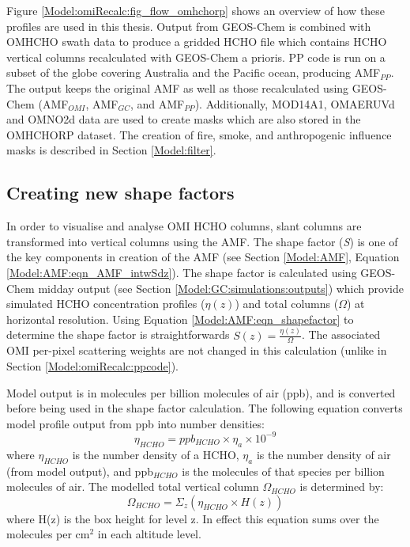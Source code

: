     
    Figure \ref{Model:omiRecalc:fig_flow_omhchorp} shows an overview of how these profiles are used in this thesis.
    Output from GEOS-Chem is combined with OMHCHO swath data to produce a gridded HCHO file which contains HCHO vertical columns recalculated with GEOS-Chem a prioris.
    PP code is run on a subset of the globe covering Australia and the Pacific ocean, producing AMF$_{PP}$.
    The output keeps the original AMF as well as those recalculated using GEOS-Chem (AMF$_{OMI}$, AMF$_{GC}$, and AMF$_{PP}$).
    Additionally, MOD14A1, OMAERUVd and OMNO2d data are used to create masks which are also stored in the OMHCHORP dataset.
    The creation of fire, smoke, and anthropogenic influence masks is described in Section \ref{Model:filter}.
    
      
    
  \subsection{Creating new shape factors}
    In order to visualise and analyse OMI HCHO columns, slant columns are transformed into vertical columns using the AMF.
    The shape factor (\textit{S}) is one of the key components in creation of the AMF (see Section \ref{Model:AMF}, Equation \ref{Model:AMF:eqn_AMF_intwSdz}).
    The shape factor is calculated using GEOS-Chem midday output (see Section \ref{Model:GC:simulations:outputs}) which provide simulated HCHO concentration profiles ($\eta(z)$) and total columns ($\Omega$) at \lowhr horizontal resolution.
    Using Equation \ref{Model:AMF:eqn_shapefactor} to determine the shape factor is straightforwards $S(z) = \frac{\eta(z)}{\Omega}$.
    The associated OMI per-pixel scattering weights are not changed in this calculation (unlike in Section \ref{Model:omiRecalc:ppcode}).
    
    Model output is in molecules per billion molecules of air (ppb), and is converted before being used in the shape factor calculation.
    The following equation converts model profile output from ppb into number densities:
    \begin{equation} \label{Model:omiRecalc:eqn_ppb_to_n}
      \eta_{HCHO} = ppb_{HCHO} \times \eta_a \times 10^{-9}
    \end{equation}
    where $\eta_{HCHO}$ is the number density of a HCHO, $\eta_a$ is the number density of air (from model output), and ppb$_{HCHO}$ is the molecules of that species per billion molecules of air.
    The modelled total vertical column $\Omega_{HCHO}$ is determined by:
    \begin{equation*}
      \Omega_{HCHO} = \Sigma_z \left( \eta_{HCHO} \times H(z) \right)
    \end{equation*}
    where H(z) is the box height for level z.
    In effect this equation sums over the molecules per cm$^2$ in each altitude level.
    
